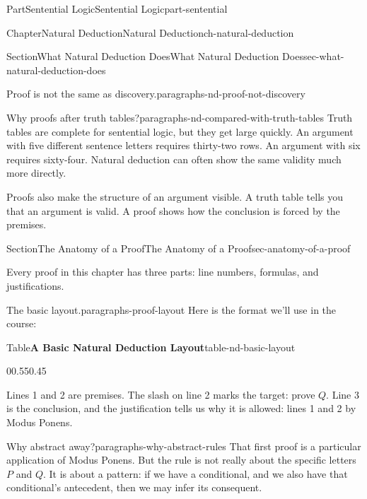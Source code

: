 \documentclass[oneside,10pt,]{book}
\newcommand{\tabularfont}{\relax}
\begin{document}
\begin{partptx}{Part}{Sentential Logic}{}{Sentential Logic}{}{}{part-sentential}
\begin{chapterptx}{Chapter}{Natural Deduction}{}{Natural Deduction}{}{}{ch-natural-deduction}
\begin{sectionptx}{Section}{What Natural Deduction Does}{}{What Natural Deduction Does}{}{}{sec-what-natural-deduction-does}
\begin{paragraphs}{Proof is not the same as discovery.}{paragraphs-nd-proof-not-discovery}
\end{paragraphs}%
\begin{paragraphs}{Why proofs after truth tables?}{paragraphs-nd-compared-with-truth-tables}%
Truth tables are complete for sentential logic, but they get large quickly. An argument with five different sentence letters requires thirty-two rows. An argument with six requires sixty-four. Natural deduction can often show the same validity much more directly.%
\par
Proofs also make the structure of an argument visible. A truth table tells you that an argument is valid. A proof shows how the conclusion is forced by the premises.%
\end{paragraphs}%
\end{sectionptx}
%
%
\typeout{************************************************}
\typeout{************************************************}
%
\begin{sectionptx}{Section}{The Anatomy of a Proof}{}{The Anatomy of a Proof}{}{}{sec-anatomy-of-a-proof}
\begin{introduction}{}%
Every proof in this chapter has three parts: line numbers, formulas, and justifications.%
\end{introduction}%
\begin{paragraphs}{The basic layout.}{paragraphs-proof-layout}%
Here is the format we'll use in the course:%
\begin{tableptx}{Table}{\textbf{A Basic Natural Deduction Layout}}{table-nd-basic-layout}{}%
\begin{tabularbox}{0}{0.55}{0.45}%
\resizebox{\ifdim\width > \linewidth\linewidth\else\width\fi}{!}{%
{\tabularfont%
\begin{tabular}{lll}
1.&\(P \supset Q\)&\tabularnewline[0pt]
2.&\(P\)&\slash{} \(Q\)\tabularnewline[0pt]
3.&\(Q\)&1,2 MP
\end{tabular}
}%
}%
\end{tabularbox}%
\end{tableptx}%
Lines 1 and 2 are premises. The slash on line 2 marks the target: prove \(Q\). Line 3 is the conclusion, and the justification tells us why it is allowed: lines 1 and 2 by Modus Ponens.%
\end{paragraphs}%
\begin{paragraphs}{Why abstract away?}{paragraphs-why-abstract-rules}%
That first proof is a particular application of Modus Ponens. But the rule is not really about the specific letters \(P\) and \(Q\). It is about a pattern: if we have a conditional, and we also have that conditional's antecedent, then we may infer its consequent.%

\end{paragraphs}
\end{sectionptx}
\end{chapterptx}
\end{partptx}
\end{document}
